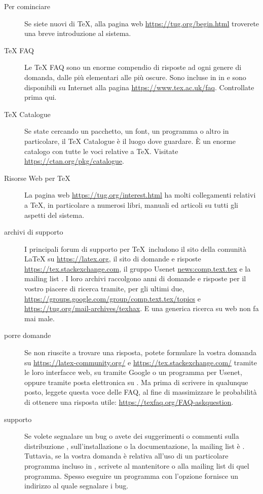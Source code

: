 \documentclass{article}
\begin{document}
\begin{description}
\item [Per cominciare] Se siete nuovi di \TeX, alla pagina web
  \url{https://tug.org/begin.html} troverete una breve introduzione al sistema.

\item [\TeX{} FAQ] Le \TeX{} FAQ sono un enorme compendio di
  risposte ad ogni genere di domanda, dalle più elementari alle più
  oscure. Sono incluse in \TL{} in
   e sono disponibili
  su Internet alla pagina \url{https://www.tex.ac.uk/faq}. Controllate
  prima qui.

\item [\TeX{} Catalogue] Se state cercando un pacchetto, un font, un
  programma o altro in particolare, il \TeX{} Catalogue è il luogo dove
  guardare. È un enorme catalogo con tutte le voci relative a \TeX. Visitate
  \url{https://ctan.org/pkg/catalogue}.

\item [Risorse Web per \TeX{}] La pagina web
  \url{https://tug.org/interest.html} ha molti collegamenti relativi a
  \TeX, in particolare a numerosi libri, manuali ed articoli su tutti
  gli aspetti del sistema.

\item [archivi di supporto] I principali forum di supporto per \TeX\
  includono
  il sito della comunità \LaTeX{} su \url{https://latex.org},
  il sito di domande e risposte \url{https://tex.stackexchange.com}, il
  gruppo Usenet \url{news:comp.text.tex} e la mailing list
  . I loro archivi raccolgono anni di domande e risposte
  per il vostro piacere di ricerca tramite, per gli ultimi due,
  \url{https://groups.google.com/group/comp.text.tex/topics} e
  \url{https://tug.org/mail-archives/texhax}. E una
  generica ricerca su web non fa mai male.

\item [porre domande] Se non riuscite a trovare una risposta, potete
  formulare la vostra domanda su
  \url{https://latex-community.org/} e \url{https://tex.stackexchange.com/}
  tramite le loro interfacce web, su \dirname{comp.text.tex} tramite Google o
  un programma per Usenet, oppure tramite posta elettronica su
  . Ma prima di scrivere in qualunque posto, leggete
  questa voce delle FAQ, al fine di massimizzare le probabilità di ottenere una
  risposta utile:
  \url{https://texfaq.org/FAQ-askquestion}.

\item [supporto \TL{}] Se volete segnalare un bug o avete dei suggerimenti o
  commenti sulla distribuzione \TL{}, sull'installazione o la
  documentazione, la mailing list è . Tuttavia, se
  la vostra domanda è relativa all'uso di un particolare programma incluso in
  \TL{}, scrivete al mantenitore o alla mailing list di quel programma.
  Spesso eseguire un programma con l'opzione \code{-{}-help} fornisce un
  indirizzo al quale segnalare i bug.

\end{description}
\end{document}
